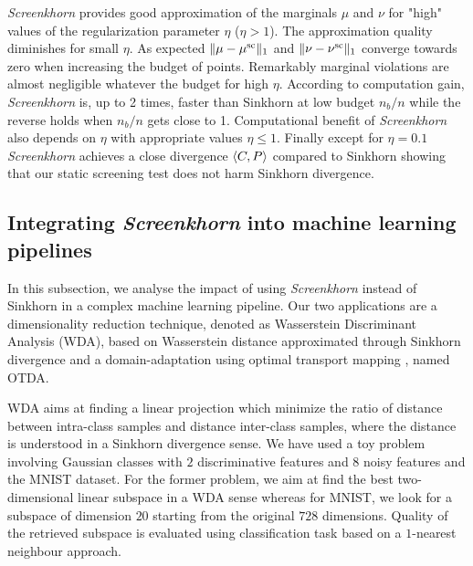 %
\emph{Screenkhorn} provides good approximation of the marginals $\mu$ and $\nu$ for "high" values of the regularization parameter $\eta$ ($\eta > 1$). The approximation quality diminishes for small $\eta$. As expected $\|{\mu} -{\mu}^{\text{sc}}\|_1$ and $\|{\nu} -{\nu}^{\text{sc}}\|_1$ converge towards zero when increasing the budget of points. Remarkably marginal violations are almost negligible whatever the budget for high $\eta$.  According to computation gain, \emph{Screenkhorn} is, up to 2 times, faster than Sinkhorn at low budget $n_b/n$ while the reverse holds when $n_b/n$ gets close to 1.  Computational benefit of \emph{Screenkhorn} also depends on $\eta$ with appropriate values $\eta \leq 1$. Finally except for $\eta=0.1$ \emph{Screenkhorn} achieves a close divergence $\langle C, P \rangle$ compared to Sinkhorn showing that our static screening test does not harm Sinkhorn divergence.  































\subsection{Integrating \emph{Screenkhorn} into machine learning pipelines}

In this subsection, we analyse the impact of using \emph{Screenkhorn}
instead of Sinkhorn in a complex machine learning pipeline. Our two applications
are a dimensionality reduction technique, denoted as Wasserstein Discriminant Analysis (WDA), based on Wasserstein distance approximated
through Sinkhorn divergence \citep{flamary2018WDA} and a domain-adaptation using optimal transport mapping \citep{courty2017optimal}, named OTDA. 


WDA aims at finding a linear projection which minimize the ratio of distance between intra-class samples and distance inter-class samples, where the distance is understood
in a Sinkhorn divergence sense. We have used a toy problem involving Gaussian classes with $2$ discriminative features and $8$ noisy features and the MNIST dataset. For the
former problem, we aim at find the best two-dimensional linear subspace in a WDA sense whereas for MNIST, we look for a subspace of dimension $20$ starting from the original
$728$ dimensions.  Quality of the retrieved subspace is evaluated using classification task based on a $1$-nearest neighbour approach.


